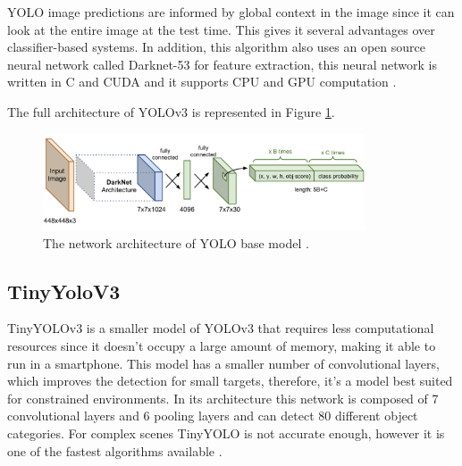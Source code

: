     \newpage
    \par YOLO image predictions are informed by global context in the image since it can look at the entire image at the test time. This gives it several advantages over classifier-based systems. In addition, this algorithm also uses an open source neural network called Darknet-53 for feature extraction, this neural network is written in C and CUDA and it supports CPU and GPU computation \cite{Redmon2018}.\par 
    \par The full architecture of YOLOv3 is represented in Figure \ref{fig:yolov3}.

    \begin{figure}[H]
        \centering
        \captionsetup{justification=centering}
        \includegraphics[width=0.85\textwidth]{Sections/2StateOfTheArt/2_images/yolo-network-architecture.png}
        \caption[YOLO base model network architecture.]{The network architecture of YOLO base model \cite{weng2018detection4}.}
        \label{fig:yolov3} 
    \end{figure}

    

   


    \subsection{TinyYoloV3}
    \label{sec:tiny_yolo}

    TinyYOLOv3 is a smaller model of YOLOv3 that requires less computational resources since it doesn’t occupy a large amount of memory, making it able to run in a smartphone. This model has a smaller number of convolutional layers, which improves the detection for small targets, therefore, it’s a model best suited for constrained environments. In its architecture this network is composed of 7 convolutional layers and 6 pooling layers and can detect 80 different object categories.  For complex scenes TinyYOLO is not accurate enough, however it is one of the fastest algorithms available \cite{Yi2019}.


